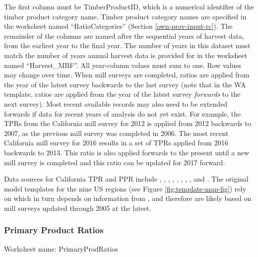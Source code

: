\documentclass[
  openany]{book}
\begin{document}
The first column must be TimberProductID, which is a numerical identifier of the timber product category name. Timber product category names are specified in the worksheet named ``RatioCategories'' (Section \ref{own-prov-input-rc}). The remainder of the columns are named after the sequential years of harvest data, from the earliest year to the final year. The number of years in this dataset must match the number of years annual harvest data is provided for in the worksheet named ``Harvest\_MBF''. All year-column values must sum to one. Row values may change over time. When mill surveys are completed, ratios are applied from the year of the latest survey backwards to the last survey (note that in the WA template, ratios are applied from the year of the latest survey \emph{forwards} to the next survey). Most recent available records may also need to be extended forwards if data for recent years of analysis do not yet exist. For example, the TPRs from the California mill survey for 2012 is applied from 2012 backwards to 2007, as the previous mill survey was completed in 2006. The most recent California mill survey for 2016 results in a set of TPRs applied from 2016 backwards to 2013. This ratio is also applied forwards to the present until a new mill survey is completed and this ratio can be updated for 2017 forward.

Data sources for California TPR and PPR include \textcite{barrette1970}, \textcite{hiserote1978}, \textcite{howard1974}, \textcite{marcille2020}, \textcite{mciver2015}, \textcite{morgan2004}, \textcite{morgan2012}, \textcite{ward1995}, and \textcite{ward1997}. The original model templates for the nine US regions (see Figure \ref{fig:template-map-fig}) rely on \textcite{smith2006} which in turn depends on information from \textcite{adams2006}, and therefore are likely based on mill surveys updated through 2005 at the latest.

\hypertarget{own-prov-input-ppr}{%
\subsubsection{Primary Product Ratios}\label{own-prov-input-ppr}}

Worksheet name: PrimaryProdRatios
\end{document}
